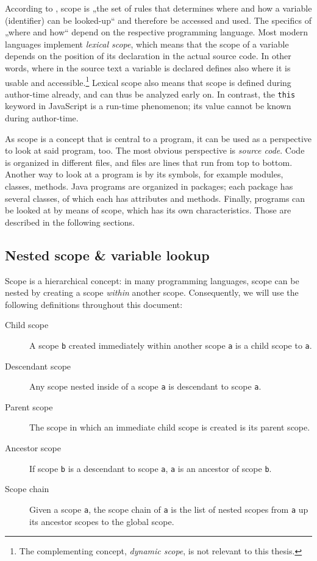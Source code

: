According to , scope is „the set of rules that
determines where and how a \gls{variable} (\gls{identifier}) can be
looked-up“ and therefore be accessed and used. The specifics of „where
and how“ depend on the respective programming language. Most modern
languages implement \emph{lexical scope}, which means that the scope of
a variable depends on the position of its declaration in the actual
source code. In other words, where in the source text a variable is
declared defines also where it is usable and
accessible.\footnote{The complementing concept, \emph{dynamic scope}, is not relevant to this thesis.}
Lexical scope also means that scope is defined during author-time
already, and can thus be analyzed early on. In contrast, the
\texttt{this} keyword in JavaScript is a run-time phenomenon; its value
cannot be known during author-time.

As scope is a concept that is central to a program, it can be used as a
perspective to look at said program, too. The most obvious perspective
is \emph{source code}. Code is organized in different files, and files
are lines that run from top to bottom. Another way to look at a program
is by its symbols, for example modules, classes, methods. Java programs
are organized in packages; each package has several classes, of which
each has attributes and methods. Finally, programs can be looked at by
means of scope, which has its own characteristics. Those are described
in the following sections.

\subsection{Nested scope \& variable
lookup}\label{nested-scope-variable-lookup}

Scope is a hierarchical concept: in many programming languages, scope
can be nested by creating a scope \emph{within} another scope.
Consequently, we will use the following definitions throughout this
document:

\begin{description}
\item[Child scope]
A scope \texttt{b} created immediately within another scope \texttt{a}
is a child scope to \texttt{a}.
\item[Descendant scope]
Any scope nested inside of a scope \texttt{a} is descendant to scope
\texttt{a}.
\item[Parent scope]
The scope in which an immediate child scope is created is its parent
scope.
\item[Ancestor scope]
If scope \texttt{b} is a descendant to scope \texttt{a}, \texttt{a} is
an ancestor of scope \texttt{b}.
\item[Scope chain]
Given a scope \texttt{a}, the scope chain of \texttt{a} is the list of
nested scopes from \texttt{a} up its ancestor scopes to the global
scope.
\end{description}

